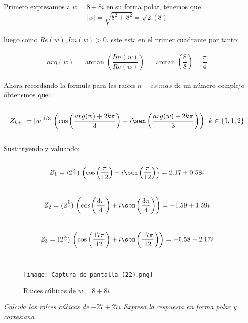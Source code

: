 \documentclass[11pt,letterpaper]{article}
\begin{document}
    Primero expresamos a $w=8+8i$ en su forma polar, tenemos que\,\\
    \begin{equation*}
        |w|=\sqrt{8^2+8^2}=\sqrt{2}(8)
    \end{equation*}\,\\
    luego como $Re(w),Im(w)>0$, este esta en el primer cuadrante por tanto:\,\\
    \,\\
    \begin{equation*}
        arg(w)=\arctan\left(\frac{Im(w)}{Re(w)}\right)=\arctan\left(\frac{8}{8}\right)=\frac{\pi}{4}
    \end{equation*}\,\\
    Ahora recordando la formula para las raices $n-esimas$ de un n\'umero complejo obtenemos que:\,\\
    \,\\
    \begin{equation*}
        Z_{k+1}=|w|^{1/3}\,\left(\cos\left(\frac{arg(w)+2k\pi}{3}\right)+i\sen\left(\frac{arg(w)+2k\pi}{3}\right)\right)\,\,\,k\in\{0,1,2\}
    \end{equation*}\,\\
    Sustituyendo y valuando:\,\\
    \,\\
    \begin{equation*}
        Z_1=(2^{\frac{7}{6}})\,\left(\cos\left(\frac{\pi}{12}\right)+i\sen\left(\frac{\pi}{12}\right)\right)=2.17+0.58i
    \end{equation*}
    \,\\
    \begin{equation*}
        Z_2=(2^{\frac{7}{6}})\,\left(\cos\left(\frac{3\pi}{4}\right)+i\sen\left(\frac{3\pi}{4}\right)\right)=-1.59+1.59i
    \end{equation*}
\,\\
    \begin{equation*}
        Z_3=(2^{\frac{7}{6}})\,\left(\cos\left(\frac{17\pi}{12}\right)+i\sen\left(\frac{17\pi}{12}\right)\right)=-0.58-2.17i
    \end{equation*}
    \,\\
    \begin{figure}[htb]
    \centering
    \texttt{[image: Captura de pantalla (22).png]}
    \caption{Raices c\'ubicas de $w=8+8i$}
    \label{Cono rebanado}
\end{figure}
\newpage
\begin{tcolorbox}[
	title = \textcolor{black}{\textcolor{white}{Problema 4}},]
\textit{Calcula las ra\'ices c\'ubicas de $-27+27i$.Expresa la respuesta en
forma polar y cartesiana
}
\end{tcolorbox}
\end{document}
